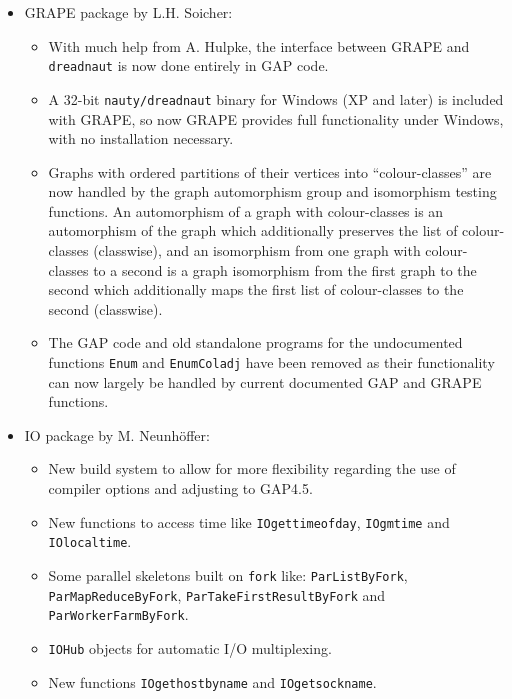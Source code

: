 \documentclass[a4paper,11pt]{report}
\begin{document}
{{{\begin{itemize}
\item  \textsf{GRAPE} package by L.H. Soicher: 
\begin{itemize}
\item  With much help from A. Hulpke, the interface between \textsf{GRAPE} and \texttt{dreadnaut} is now done entirely in \textsf{GAP} code. 
\item  A 32-bit \texttt{nauty/dreadnaut} binary for Windows (XP and later) is included with \textsf{GRAPE}, so now \textsf{GRAPE} provides full functionality under Windows, with no installation necessary. 
\item  Graphs with ordered partitions of their vertices into ``colour-classes'' are now handled by the graph automorphism group and isomorphism testing
functions. An automorphism of a graph with colour-classes is an automorphism
of the graph which additionally preserves the list of colour-classes
(classwise), and an isomorphism from one graph with colour-classes to a second
is a graph isomorphism from the first graph to the second which additionally
maps the first list of colour-classes to the second (classwise). 
\item  The \textsf{GAP} code and old standalone programs for the undocumented functions \texttt{Enum} and \texttt{EnumColadj} have been removed as their functionality can now largely be handled by current
documented \textsf{GAP} and \textsf{GRAPE} functions. 
\end{itemize}
 
\item  \textsf{IO} package by M. Neunh{\"o}ffer: 
\begin{itemize}
\item  New build system to allow for more flexibility regarding the use of compiler
options and adjusting to \textsf{GAP}{\nobreakspace}4.5. 
\item  New functions to access time like \texttt{IO{\textunderscore}gettimeofday}, \texttt{IO{\textunderscore}gmtime} and \texttt{IO{\textunderscore}localtime}. 
\item  Some parallel skeletons built on \texttt{fork} like: \texttt{ParListByFork}, \texttt{ParMapReduceByFork}, \texttt{ParTakeFirstResultByFork} and \texttt{ParWorkerFarmByFork}. 
\item  \texttt{IOHub} objects for automatic I/O multiplexing. 
\item  New functions \texttt{IO{\textunderscore}gethostbyname} and \texttt{IO{\textunderscore}getsockname}. 
\end{itemize}
 

\end{itemize}}}}
\end{document}

